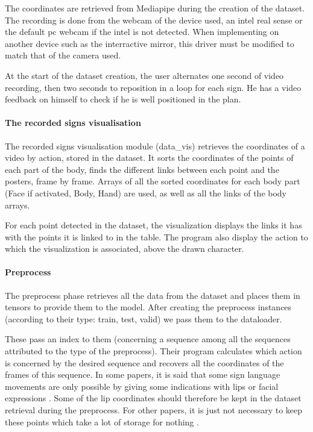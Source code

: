 The coordinates are retrieved from Mediapipe during the creation of the dataset. The recording is done from the webcam of the device used, an intel real sense or the default pc webcam if the intel is not detected. When implementing on another device such as the interractive mirror, this driver must be modified to match that of the camera used.

At the start of the dataset creation, the user alternates one second of video recording, then two seconds to reposition in a loop for each sign. He has a video feedback on himself to check if he is well positioned in the plan.

\paragraph{The recorded signs visualisation}

The recorded signs visualisation module (data\_vis) retrieves the coordinates of a video by action, stored in the dataset.
It sorts the coordinates of the points of each part of the body, finds the different links between each point and the posters, frame by frame. Arrays of all the sorted coordinates for each body part (Face if activated, Body, Hand) are used, as well as all the links of the body arrays.

For each point detected in the dataset, the visualization displays the links it has with the points it is linked to in the table. The program also display the action to which the visualization is associated, above the drawn character.

\paragraph{Preprocess}

The preprocess phase retrieves all the data from the dataset and places them in tensors to provide them to the model.
After creating the preprocess instances (according to their type: train, test, valid) we pass them to the dataloader. 

These pass an index to them (concerning a sequence among all the sequences attributed to the type of the preprocess). Their program calculates which action is concerned by the desired sequence and recovers all the coordinates of the frames of this sequence. 
In some papers, it is said that some sign language movements are only possible by giving some indications with lips or facial expressions \cite{cooper2011sign}. Some of the lip coordinates should therefore be kept in the dataset retrieval during the preprocess. For other papers, it is just not necessary to keep these points which take a lot of storage for nothing \cite{dreuw2007speech}.

